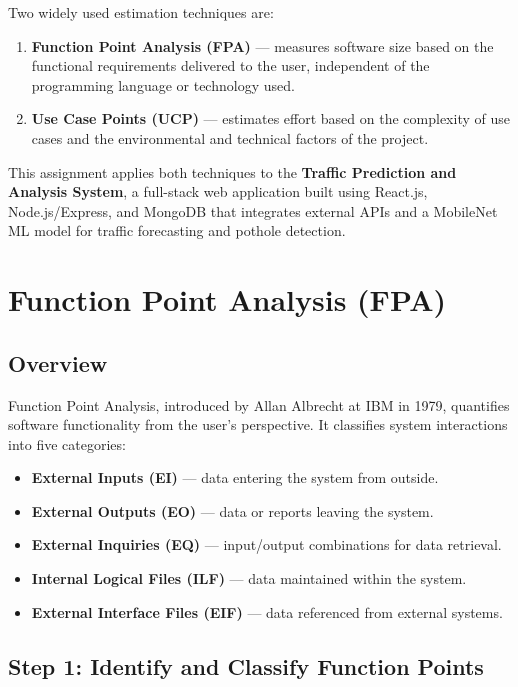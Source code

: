 \documentclass[12pt,a4paper]{article}
\begin{document}
Two widely used estimation techniques are:
\begin{enumerate}[noitemsep, label=\roman*)]
    \item \textbf{Function Point Analysis (FPA)} --- measures software size based on the functional requirements delivered to the user, independent of the programming language or technology used.
    \item \textbf{Use Case Points (UCP)} --- estimates effort based on the complexity of use cases and the environmental and technical factors of the project.
\end{enumerate}

This assignment applies both techniques to the \textbf{Traffic Prediction and Analysis System}, a full-stack web application built using React.js, Node.js/Express, and MongoDB that integrates external APIs and a MobileNet ML model for traffic forecasting and pothole detection.

\section{Function Point Analysis (FPA)}

\subsection{Overview}
Function Point Analysis, introduced by Allan Albrecht at IBM in 1979, quantifies software functionality from the user's perspective. It classifies system interactions into five categories:
\begin{itemize}[noitemsep]
    \item \textbf{External Inputs (EI)} --- data entering the system from outside.
    \item \textbf{External Outputs (EO)} --- data or reports leaving the system.
    \item \textbf{External Inquiries (EQ)} --- input/output combinations for data retrieval.
    \item \textbf{Internal Logical Files (ILF)} --- data maintained within the system.
    \item \textbf{External Interface Files (EIF)} --- data referenced from external systems.
\end{itemize}

\subsection{Step 1: Identify and Classify Function Points}
\end{document}
